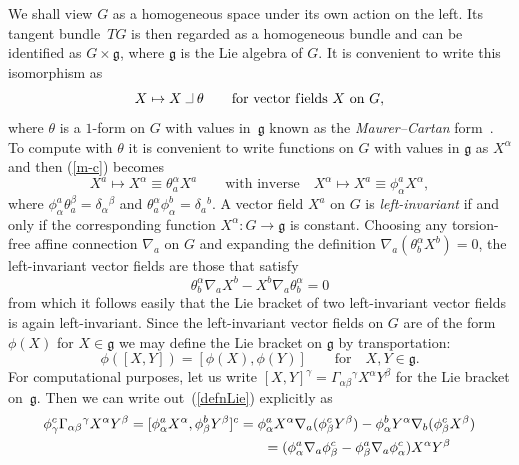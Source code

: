 \documentclass[pdftex]{sigma}
\newcommand{\intprod}{\;\rule{5pt}{.3pt}\rule{.3pt}{7pt}\;}
\begin{document}
We shall view $G$ as a homogeneous space under its own action on the left. Its
tangent bundle~$TG$ is then regarded as a homogeneous bundle and can be
identif\/ied as $G\times{\mathfrak{g}}$, where ${\mathfrak{g}}$ is the Lie
algebra of $G$. It is convenient to write this isomorphism as
\begin{equation}\label{m-c}
X\mapsto X\intprod\theta \qquad\mbox{for vector f\/ields $X$ on $G$},
\end{equation}
where $\theta$ is a $1$-form on $G$ with values in~${\mathfrak{g}}$ known as
the {\em Maurer--Cartan\/} form~\cite{ss}. To compute with $\theta$ it is
convenient to write functions on $G$ with values in ${\mathfrak{g}}$ as
$X^\alpha$ and then (\ref{m-c}) becomes
\[
X^a\mapsto X^\alpha\equiv\theta_a^\alpha X^a\qquad \mbox{with inverse}
\quad X^\alpha\mapsto X^a\equiv\phi_\alpha^a X^\alpha,
\]
where $\phi_\alpha^a\theta^\beta_a=\delta_\alpha{}^\beta$ and $\theta_a^\alpha\phi_\alpha^b=\delta_a{}^b$.
A vector f\/ield $X^a$ on $G$ is {\em left-invariant\/} if and only if the
corresponding function $X^\alpha:G\to{\mathfrak{g}}$ is constant. Choosing any
torsion-free af\/f\/ine connection $\nabla_a$ on $G$ and expanding the def\/inition
$\nabla_a(\theta_b^\alpha X^b)=0$, the left-invariant vector f\/ields are those
that satisfy
\[\theta_b^\alpha \nabla_aX^b-X^b \nabla_a\theta_b^\alpha=0\]
from which it follows easily that the Lie bracket of two left-invariant
vector f\/ields is again left-invariant.
Since the left-invariant vector f\/ields on $G$ are of the form $\phi(X)$ for
$X\in{\mathfrak{g}}$ we may def\/ine the Lie bracket
on ${\mathfrak{g}}$ by transportation: %
\begin{equation}\label{defnLie}
\phi([X,Y])=[\phi(X),\phi(Y)]\qquad\mbox{for} \quad X,Y\in{\mathfrak{g}}.
\end{equation}
For computational purposes, let us write
$[X,Y]^\gamma=\Gamma_{\alpha\beta}{}^\gamma X^\alpha Y^\beta$ for the Lie
bracket on~${\mathfrak{g}}$. Then we can write out~(\ref{defnLie}) explicitly
as
 \begin{gather*}
\phi_\gamma^c\Gamma_{\alpha\beta}{}^\gamma X^\alpha Y^\beta =
[\phi_\alpha^a X^\alpha,\phi_\beta^b Y^\beta]^c
 = \phi_\alpha^a X^\alpha \nabla_a(\phi_\beta^c Y^\beta)-
\phi_\alpha^b Y^\alpha \nabla_b(\phi_\beta^c X^\beta)\\
\hphantom{\phi_\gamma^c\Gamma_{\alpha\beta}{}^\gamma X^\alpha Y^\beta =
[\phi_\alpha^a X^\alpha,\phi_\beta^b Y^\beta]^c}{}
 = (\phi_\alpha^a \nabla_a\phi_\beta^c-\phi_\beta^a \nabla_a\phi_\alpha^c)
X^\alpha Y^\beta
\end{gather*}
\end{document}
